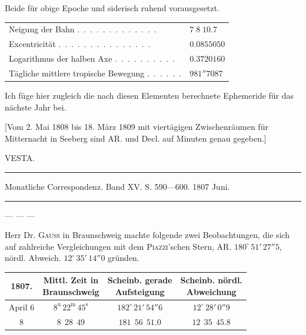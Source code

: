 \noindent Beide für obige Epoche und siderisch ruhend vorausgesetzt.

\begin{center}\begingroup\fontsize{9}{11}\selectfont
\begin{tabular}{ll}
Neigung der Bahn .\ .\ .\ .\ .\ .\ .\ .\ .\ .\ .\ .\ . & $7\;8\;10.7$ \\
Excentricität .\ .\ .\ .\ .\ .\ .\ .\ .\ .\ .\ .\ .\ .\ . & $0.0855050$ \\
Logarithmus der halben Axe .\ .\ .\ .\ .\ .\ .\ .\ .\ . & $0.3720160$ \\
Tägliche mittlere tropische Bewegung .\ .\ .\ .\ .\ . & $981''7087$
\end{tabular}\endgroup\end{center}

\par\indent Ich füge hier zugleich die nach diesen Elementen berechnete Ephemeride für das nächste Jahr bei.

[Vom 2. Mai 1808 bis 18. März 1809 mit viertägigen Zwischenräumen für Mitternacht in Seeberg sind AR. und Decl. auf Minuten genau gegeben.]

\par\bigskip
{}
\begin{center}\large VESTA.\end{center}
\begin{center}\parbox{.82\linewidth}{\centering\footnotesize\frenchspacing
\hrule height .3pt\relax\vspace{2.5pt}
Monatliche Correspondenz. Band XV. S. 590—600. 1807 Juni.\par
\vspace{2.5pt}\hrule height .3pt\relax
}\end{center}

--- --- ---

\par\indent Herr Dr. \textsc{Gauss} in Braunschweig machte folgende zwei Beobachtungen, die sich auf zahlreiche Vergleichungen mit dem \textsc{Piazzi}'schen Stern, AR. $180^\circ\,51'\,27''5$, nördl. Abweich. $12^\circ\,35'\,14''0$ gründen.

\begin{center}\begingroup
\fontsize{10}{12}\selectfont
\setlength{\tabcolsep}{2.5pt}\renewcommand{\arraystretch}{1.15}
\begin{tabular}{c|c|c|c}
1807. & \shortstack{Mittl. Zeit in\\Braunschweig} & \shortstack{Scheinb. gerade\\Aufsteigung \VestaRATwoNinety{}} & \shortstack{Scheinb. nördl.\\Abweichung \VestaDecTwoNinety{}} \\ \hline
April 6 & $8^{\text{u}}\,22^{\text{m}}\,45^{\text{s}}$ & $182^\circ\,21'\,54''6$ & $12^\circ\,28'\,0''9$ \\
8 & $8\ \ 28\ \ 49$ & $181\ \ 56\ \ 51.0$ & $12\ \ 35\ \ 45.8$
\end{tabular}\endgroup\end{center}

